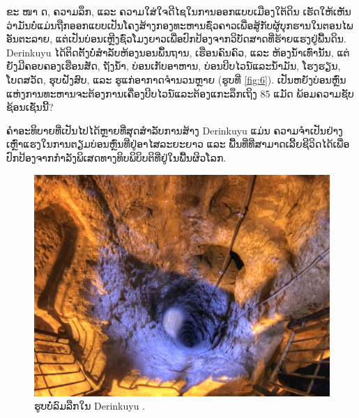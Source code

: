 \documentclass[10pt,twocolumn,letterpaper]{article}
\begin{document}
ຂະ ໜາ ດ, ຄວາມລຶກ, ແລະ ຄວາມໃສ່ໃຈດີໄຊໃນການອອກແບບເມືອງໃຕ້ດິນ ເຮັດໃຫ້ເຫັນວ່າມັນບໍ່ແມ່ນຖືກອອກແບບເປັນໂຄງສ້າງກອງທະຫານຊົ່ວຄາວເພື່ອສູ້ກັບຜູ້ບຸກຮານໃນຕອນໄພອັນຕະລາຍ, ແຕ່ເປັນບ່ອນເຫຼີງຊົ່ວໂມງຍາວເພື່ອປົກປ້ອງຈາກວິບັດສາດທີ່ຮ້າຍແຮງຢູ່ພື້ນດິນ. Derinkuyu ໄດ້ຕິດຕັ້ງບໍ່ສຳລັບຫ້ອງນອນພຶ້ນຖານ, ເຮືອນຄົນຄົວ, ແລະ ຫ້ອງນ້ຳເທົ່ານັ້ນ, ແຕ່ຍັງມີຄອບຄອງເຮືອນສັດ, ຖັງນ້ຳ, ບ່ອນເກັບອາຫານ, ບ່ອນບີບໄວນ໌ແລະນ້ຳມັນ, ໂຮງຮຽນ, ໂບດສວັດ, ຮຸບຝັງສົບ, ແລະ ຮູແກ່ອາກາດຈຳນວນຫຼາຍ (ຮູບທີ່ \ref{fig:6}). ເປັນຫຍັງບ່ອນຫຼົ່ນແຫ່ງການທະຫານຈະຕ້ອງການເຄື່ອງບີບໄວນ໌ແລະຕ້ອງແກະລຶກເຖິງ 85 ແມັດ ພ້ອມຄວາມຊັບຊ້ອນເຊັ່ນນີ້?

ຄຳອະທິບາຍທີ່ເປັນໄປໄດ້ຫຼາຍທີ່ສຸດສຳລັບການສ້າງ Derinkuyu ແມ່ນ ຄວາມຈຳເປັນຢ່າງເຫຼົ່າແຮງໃນການຕຽມບ່ອນຫຼົ່ນທີ່ຢູ່ອາໄສລະຍະຍາວ ແລະ ພື້ນທີ່ທີ່ສາມາດເລີ້ຍຊີວິດໄດ້ເພື່ອປົກປ້ອງຈາກກຳລັງພິເສດທາງທິບພິບິບຕິທີ່ຢູ່ໃນພື້ນຜິວໂລກ.

\begin{figure}[t]
\begin{center}
   \includegraphics[width=1\linewidth]{derinkuyu-air.jpg}
\end{center}
   \caption{ຮູບບໍ່ລົມລືກໃນ Derinkuyu \cite{53}.}
\label{fig:6}

\label{fig:onecol}
\end{figure}


\end{document}
